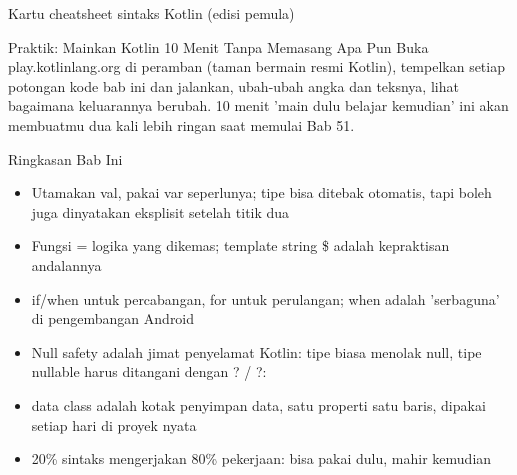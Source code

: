 \begin{center}\small\color{gray}Kartu cheatsheet sintaks Kotlin (edisi pemula)\end{center}

\begin{tcbpractice}{Praktik: Mainkan Kotlin 10 Menit Tanpa Memasang Apa Pun}
Buka play.kotlinlang.org di peramban (taman bermain resmi Kotlin), tempelkan setiap potongan kode bab ini dan jalankan, ubah-ubah angka dan teksnya, lihat bagaimana keluarannya berubah. 10 menit 'main dulu belajar kemudian' ini akan membuatmu dua kali lebih ringan saat memulai Bab 51.

\end{tcbpractice}

\begin{tcbsummary}{Ringkasan Bab Ini}
\begin{itemize}
  \item Utamakan val, pakai var seperlunya; tipe bisa ditebak otomatis, tapi boleh juga dinyatakan eksplisit setelah titik dua
  \item Fungsi = logika yang dikemas; template string \$ adalah kepraktisan andalannya
  \item if/when untuk percabangan, for untuk perulangan; when adalah 'serbaguna' di pengembangan Android
  \item Null safety adalah jimat penyelamat Kotlin: tipe biasa menolak null, tipe nullable harus ditangani dengan ? / ?:
  \item data class adalah kotak penyimpan data, satu properti satu baris, dipakai setiap hari di proyek nyata
  \item 20\% sintaks mengerjakan 80\% pekerjaan: bisa pakai dulu, mahir kemudian
\end{itemize}

\end{tcbsummary}
